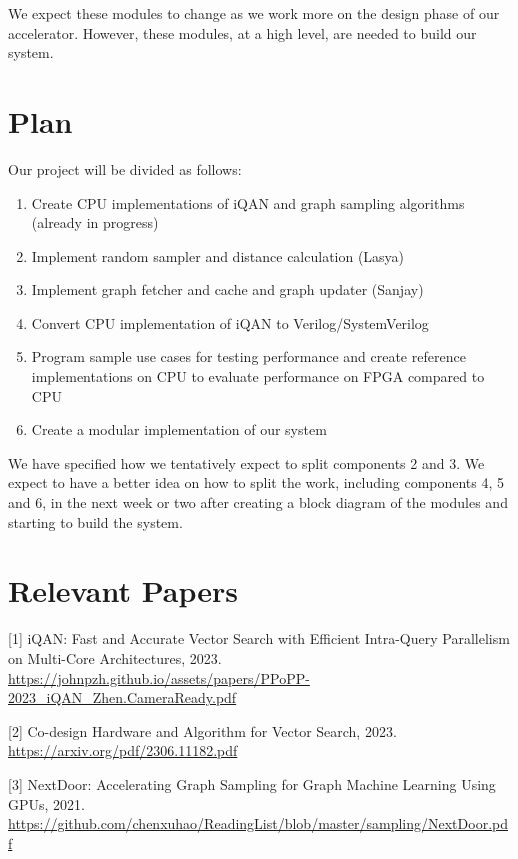 \documentclass{article}
\begin{document}
We expect these modules to change as we work more on the design phase of our accelerator. However, these modules, at a high level, are needed to build our system.



\section*{Plan}

Our project will be divided as follows:
\begin{enumerate}
    \item Create CPU implementations of iQAN and graph sampling algorithms (already in progress)
    \item Implement random sampler and distance calculation (Lasya)
    \item Implement graph fetcher and cache and graph updater (Sanjay) 
    \item Convert CPU implementation of iQAN to Verilog/SystemVerilog 
    \item  Program sample use cases for testing performance and create reference implementations on CPU to evaluate performance on FPGA compared to CPU 
    \item Create a modular implementation of our system
\end{enumerate}

We have specified how we tentatively expect to split components 2 and 3. We expect to have a better idea on how to split the work, including components 4, 5 and 6, in the next week or two after creating a block diagram of the modules and starting to build the system. 



\section*{Relevant Papers}

[1] iQAN: Fast and Accurate Vector Search with Efficient Intra-Query Parallelism on Multi-Core Architectures, 2023. \href{https://johnpzh.github.io/assets/papers/PPoPP-2023\_iQAN\_Zhen.CameraReady.pdf}{https://johnpzh.github.io/assets/papers/PPoPP-2023\_iQAN\_Zhen.CameraReady.pdf }

[2] Co-design Hardware and Algorithm for Vector Search, 2023. \href{https://arxiv.org/pdf/2306.11182.pdf} {https://arxiv.org/pdf/2306.11182.pdf }

[3] NextDoor: Accelerating Graph Sampling for Graph Machine Learning Using GPUs, 2021. 
\newline \href{https://github.com/chenxuhao/ReadingList/blob/master/sampling/NextDoor.pdf}{https://github.com/chenxuhao/ReadingList/blob/master/sampling/NextDoor.pdf }
\end{document}
